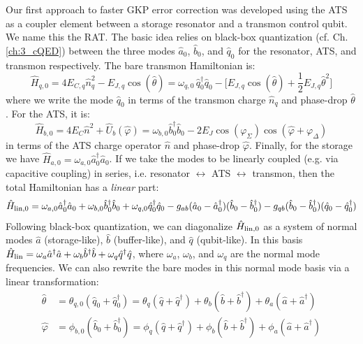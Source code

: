 Our first approach to faster GKP error correction was developed using the ATS as a coupler element between a storage resonator and a transmon control qubit. We name this the RAT. The basic idea relies on black-box quantization (cf. Ch. \ref{ch:3_cQED}) between the three modes $\hat{a}_0$, $\hat{b}_0$, and $\hat{q}_0$ for the resonator, ATS, and transmon respectively. The bare transmon Hamiltonian is:
\begin{equation}
\hat{H}_{q, 0} = 4E_{C,q}\hat{n}_q^2 - E_{J,q}\cos(\hat{\theta}) = \omega_{q,0}\,\hat{q}_0^\dagger \hat{q}_0 - \Big[E_{J,q}\cos(\hat{\theta}) + \frac{1}{2}E_{J,q} \hat{\theta}^2\Big] 
\end{equation}
where we write the mode $\hat{q}_0$ in terms of the transmon charge $\hat{n}_q$ and phase-drop $\hat{\theta}$. For the ATS, it is:
\begin{equation}
\hat{H}_{b,0} = 4E_C \hat{n}^2 + \hat{U}_b(\hat{\varphi}) = \omega_{b,0}\hat{b}_0^\dagger \hat{b}_0 - 2E_J \cos(\varphi_\Sigma)\cos(\hat{\varphi} + \varphi_\Delta)
\end{equation}
in terms of the ATS charge operator $\hat{n}$ and phase-drop $\hat{\varphi}$. Finally, for the storage we have $\hat{H}_{a, 0} = \omega_{a,0}\hat{a}_0^\dagger \hat{a}_0$. If we take the modes to be linearly coupled (e.g. via capacitive coupling) in series, i.e. resonator $\leftrightarrow$ ATS $\leftrightarrow$ transmon, then the total Hamiltonian has a \textit{linear} part:
\begin{equation}
\hat{H}_{\rm lin, 0} = \omega_{a,0}\hat{a}_0^\dagger \hat{a}_0 + \omega_{b,0}\hat{b}_0^\dagger \hat{b}_0 + \omega_{q,0}\hat{q}_0^\dagger \hat{q}_0 - g_{ab}(\hat{a}_0 - \hat{a}_0^\dagger)(\hat{b}_0 - \hat{b}_0^\dagger) - g_{qb}(\hat{b}_0 - \hat{b}_0^\dagger)(\hat{q}_0 - \hat{q}_0^\dagger)
\end{equation}
Following black-box quantization, we can diagonalize $\hat{H}_{\rm lin, 0}$ as a system of normal modes $\hat{a}$ (storage-like), $\hat{b}$ (buffer-like), and $\hat{q}$ (qubit-like). In this basis $\hat{H}_{\rm lin} = \omega_a \hat{a}^\dagger\hat{a} + \omega_b \hat{b}^\dagger\hat{b} + \omega_q \hat{q}^\dagger\hat{q}$, where $\omega_a$, $\omega_b$, and $\omega_q$ are the normal mode frequencies. We can also rewrite the bare modes in this normal mode basis via a linear transformation:
\begin{align}
\hat{\theta} &= \theta_{q, 0}(\hat{q}_0 + \hat{q}_0^\dagger) = \theta_q(\hat{q} + \hat{q}^\dagger) + \theta_b(\hat{b} + \hat{b}^\dagger) + \theta_a(\hat{a} + \hat{a}^\dagger) \\
\hat{\varphi} &= \phi_{b, 0}(\hat{b}_0 + \hat{b}_0^\dagger) = \phi_q(\hat{q} + \hat{q}^\dagger) + \phi_b(\hat{b} + \hat{b}^\dagger) + \phi_a(\hat{a} + \hat{a}^\dagger)
\label{eq:linear_basis_RAT_RAF}
\end{align}
